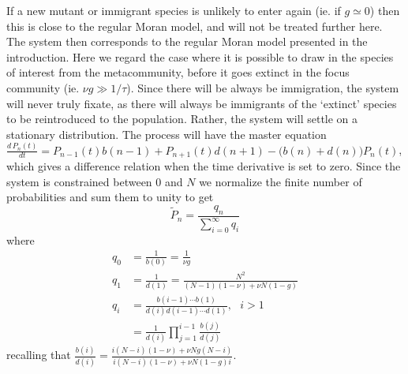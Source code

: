 If a new mutant or immigrant species is unlikely to enter again (ie. if $g\simeq 0$) then this is close to the regular Moran model, and will not be treated further here. %
The system then corresponds to the regular Moran model presented in the introduction. 
Here we regard the case where it is possible to draw in the species of interest from the metacommunity, before it goes extinct in the focus community (ie. $\nu g \gg 1/\tau$). %
Since there will be always be immigration, the system will never truly fixate, as there will always be immigrants of the `extinct' species to be reintroduced to the population.  
Rather, the system will settle on a stationary distribution. 
The process will have the master equation $\frac{d\,P_n(t)}{dt} = P_{n-1}(t)b(n-1) + P_{n+1}(t)d(n+1) - \big(b(n)+d(n)\big)P_n(t)$,
which gives a difference relation when the time derivative is set to zero. 
Since the system is constrained between $0$ and $N$ we normalize the finite number of probabilities and sum them to unity to get
\begin{equation}
\widetilde{P}_n = \frac{q_n}{\sum_{i=0}^\infty q_i}
\end{equation}
where
\begin{align*}
 q_0 &= \frac{1}{b(0)} = \frac{1}{\nu g} \\
 q_1 &= \frac{1}{d(1)} = \frac{N^2}{(N-1)(1-\nu) + \nu N(1-g)} \\
 q_i &= \frac{b(i-1)\cdots b(1)}{d(i)d(i-1)\cdots d(1)}, \text{  } i>1 \\
     &= \frac{1}{d(i)}\prod_{j=1}^{i-1}\frac{b(j)}{d(j)}
\end{align*}
recalling that $\frac{b(i)}{d(i)} = \frac{i(N-i)(1-\nu) + \nu Ng(N-i)}{i(N-i)(1-\nu) + \nu N(1-g)i}$.
%
